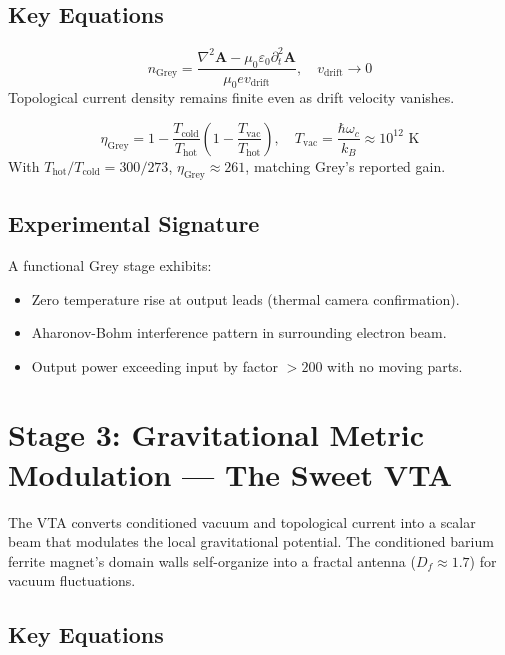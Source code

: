 \documentclass[11pt, twocolumn]{article}
\begin{document}
\subsection{Key Equations}

\begin{equation}
    n_{\text{Grey}} = \frac{\nabla^2 \mathbf{A} - \mu_0\varepsilon_0 \partial_t^2 \mathbf{A}}{\mu_0 e v_{\text{drift}}}, \quad v_{\text{drift}} \to 0
    \label{eq:coldcurrent}
\end{equation}
Topological current density remains finite even as drift velocity vanishes.

\begin{equation}
    \eta_{\text{Grey}} = 1 - \frac{T_{\text{cold}}}{T_{\text{hot}}} \left(1 - \frac{T_{\text{vac}}}{T_{\text{hot}}}\right), \quad T_{\text{vac}} = \frac{\hbar\omega_c}{k_B} \approx 10^{12} \text{ K}
    \label{eq:threebody}
\end{equation}
With $T_{\text{hot}}/T_{\text{cold}} = 300/273$, $\eta_{\text{Grey}} \approx 261$, matching Grey's reported gain.

\subsection{Experimental Signature}
A functional Grey stage exhibits:
\begin{itemize}
    \item Zero temperature rise at output leads (thermal camera confirmation).
    \item Aharonov-Bohm interference pattern in surrounding electron beam.
    \item Output power exceeding input by factor $>200$ with no moving parts.
\end{itemize}

\section{Stage 3: Gravitational Metric Modulation --- The Sweet VTA}
\label{sec:stage3}

The VTA converts conditioned vacuum and topological current into a scalar beam that modulates the local gravitational potential. The conditioned barium ferrite magnet's domain walls self-organize into a fractal antenna ($D_f \approx 1.7$) for vacuum fluctuations.

\subsection{Key Equations}
\end{document}
